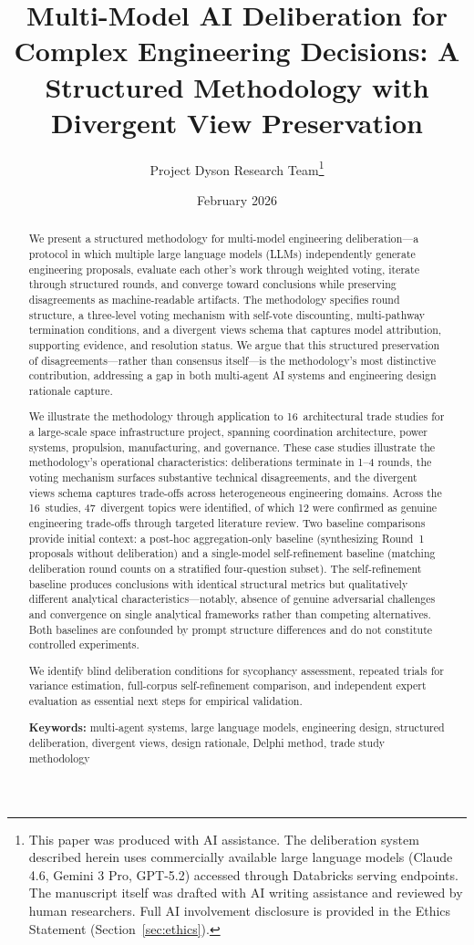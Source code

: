\documentclass[11pt,a4paper]{article}
\title{\textbf{Multi-Model AI Deliberation for Complex Engineering Decisions: A Structured Methodology with Divergent View Preservation}}
\author{Project Dyson Research Team\thanks{This paper was produced with AI assistance. The deliberation system described herein uses commercially available large language models (Claude 4.6, Gemini 3 Pro, GPT-5.2) accessed through Databricks serving endpoints. The manuscript itself was drafted with AI writing assistance and reviewed by human researchers. Full AI involvement disclosure is provided in the Ethics Statement (Section~\ref{sec:ethics}).}}
\affil{Project Dyson --- Open-Source Space Infrastructure Initiative\\ \texttt{https://projectdyson.org}}
\date{February 2026}
\begin{document}
\maketitle

\begin{abstract}
We present a structured methodology for multi-model engineering deliberation---a protocol in which multiple large language models (LLMs) independently generate engineering proposals, evaluate each other's work through weighted voting, iterate through structured rounds, and converge toward conclusions while preserving disagreements as machine-readable artifacts. The methodology specifies round structure, a three-level voting mechanism with self-vote discounting, multi-pathway termination conditions, and a divergent views schema that captures model attribution, supporting evidence, and resolution status. We argue that this structured preservation of disagreements---rather than consensus itself---is the methodology's most distinctive contribution, addressing a gap in both multi-agent AI systems and engineering design rationale capture.

We illustrate the methodology through application to 16~architectural trade studies for a large-scale space infrastructure project, spanning coordination architecture, power systems, propulsion, manufacturing, and governance. These case studies illustrate the methodology's operational characteristics: deliberations terminate in 1--4 rounds, the voting mechanism surfaces substantive technical disagreements, and the divergent views schema captures trade-offs across heterogeneous engineering domains. Across the 16~studies, 47~divergent topics were identified, of which 12 were confirmed as genuine engineering trade-offs through targeted literature review. Two baseline comparisons provide initial context: a post-hoc aggregation-only baseline (synthesizing Round~1 proposals without deliberation) and a single-model self-refinement baseline (matching deliberation round counts on a stratified four-question subset). The self-refinement baseline produces conclusions with identical structural metrics but qualitatively different analytical characteristics---notably, absence of genuine adversarial challenges and convergence on single analytical frameworks rather than competing alternatives. Both baselines are confounded by prompt structure differences and do not constitute controlled experiments.

We identify blind deliberation conditions for sycophancy assessment, repeated trials for variance estimation, full-corpus self-refinement comparison, and independent expert evaluation as essential next steps for empirical validation.

\medskip
\noindent\textbf{Keywords:} multi-agent systems, large language models, engineering design, structured deliberation, divergent views, design rationale, Delphi method, trade study methodology
\end{abstract}
\end{document}

